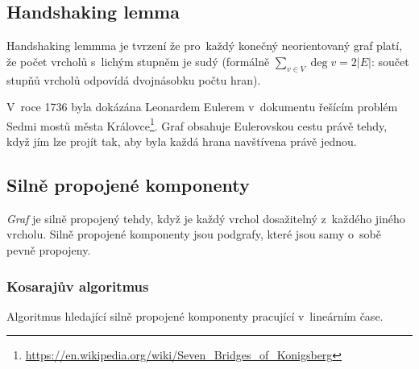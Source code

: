 \subsection{Handshaking lemma}

Handshaking lemmma je tvrzení že pro~každý konečný neorientovaný graf platí, že počet vrcholů s~lichým stupněm je sudý (formálně $\sum_{v \in V} \deg v = 2 |E|$: součet stupňů vrcholů odpovídá dvojnásobku počtu hran).

V~roce 1736 byla dokázána Leonardem Eulerem v~dokumentu řešícím problém Sedmi mostů města Královce\footnote{\url{https://en.wikipedia.org/wiki/Seven_Bridges_of_Konigsberg}}.
Graf obsahuje Eulerovskou cestu právě tehdy, když jím lze projít tak, aby byla každá hrana navštívena právě jednou.

\subsection{Silně propojené komponenty}

\emph{Graf} je silně propojený tehdy, když je každý vrchol dosažitelný z~každého jiného vrcholu.
Silně propojené komponenty jsou podgrafy, které jsou samy o~sobě pevně propojeny.

\subsubsection{Kosarajův algoritmus}

Algoritmus hledající silně propojené komponenty pracující v~lineárním čase.

